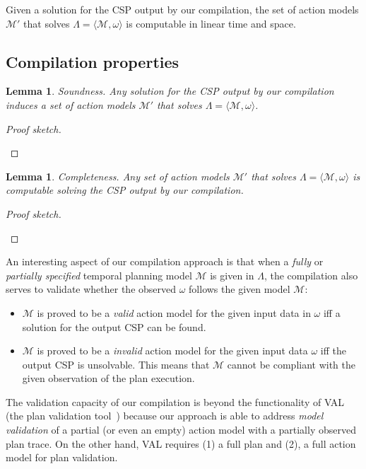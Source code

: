 \documentclass[letterpaper]{article} %
\newcommand{\tup}[1]{{\langle #1 \rangle}}
\newtheorem{lemma}[theorem]{Lemma}
\begin{document}
Given a solution for the CSP output by our compilation, the set of action models $\mathcal{M}'$ that solves $\Lambda=\tup{\mathcal{M},\omega}$ is computable in linear time and space. 


\subsection{Compilation properties}
\begin{lemma}
Soundness. Any solution for the CSP output by our compilation induces a set of action models $\mathcal{M}'$ that solves $\Lambda=\tup{\mathcal{M},\omega}$.
\end{lemma}

\begin{proof}[Proof sketch]
\begin{small}
\end{small}
\end{proof}

\begin{lemma}
Completeness. Any set of action models $\mathcal{M}'$ that solves $\Lambda=\tup{\mathcal{M},\omega}$ is computable solving the CSP output by our compilation.
\end{lemma}

\begin{proof}[Proof sketch]
\begin{small}
\end{small}
\end{proof}

An interesting aspect of our compilation approach is that when a {\em fully} or {\em partially specified} temporal planning model $\mathcal{M}$ is given in $\Lambda$, the compilation also serves to validate whether the observed $\omega$ follows the given model $\mathcal{M}$:

\begin{itemize}
	\item $\mathcal{M}$ is proved to be a {\em valid} action model for the given input data in $\omega$ iff a solution for the output CSP can be found.
	\item $\mathcal{M}$ is proved to be a {\em invalid} action model for the given input data $\omega$ iff the output CSP is unsolvable. This means that $\mathcal{M}$ cannot be compliant with the given observation of the plan execution.
\end{itemize}

The validation capacity of our compilation is beyond the functionality of VAL (the plan validation tool~\cite{howey2004val}) because our approach is able to address {\em model validation} of a partial (or even an empty) action model with a partially observed plan trace. On the other hand, VAL requires (1) a full plan and (2), a full action model for plan validation.
\end{document}
